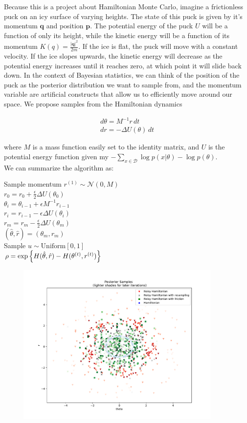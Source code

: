 Because this is a project about Hamiltonian Monte Carlo, imagine a frictionless puck on an icy surface of varying heights. The state of this puck is given by it's momentum $\bm{q}$ and position $\bm{p}$. The potential energy of the puck $U$ will be a function of only its height, while the kinetic energy will be a function of its momentum $K(q)=\frac{|\bm{q}|^2}{2m}$. If the ice is flat, the puck will move with a constant velocity. If the ice slopes upwards, the kinetic energy will decrease as the potential energy increases until it reaches zero, at which point it will slide back down. In the context of Bayesian statistics, we can think of the position of the puck as the posterior distribution we want to sample from, and the momentum variable are artificial constructs that allow us to efficiently move around our space. We propose samples from the Hamiltonian dynamics

\begin{gather*}
	d\theta=M^{-1}r\,dt\\
	dr = -\Delta U(\theta)\,dt
\end{gather*}

where $M$ is a mass function easily set to the identity matrix, and $U$ is the potential energy function given my $-\sum_{x\in\mathcal{D}}\log p(x|\theta)-\log p(\theta)$.
\\

We can summarize the algorithm as:

\begin{algorithm}[H]
	 {
		Sample momentum $r^{(1)}\sim\mathcal{N}(0, M)$\\
		$r_0=r_0+\frac{\epsilon}{2}\Delta U(\theta_0)$\\
		 {
			$\theta_i=\theta_{i-1}+\epsilon M^{-1}r_{i-1}$\\
			$r_i = r_{i-1} - \epsilon  \Delta U(\theta_i)$\\
		}
		$r_m = r_m -\frac{\epsilon}{2}\Delta U(\theta_m)$\\
		$(\hat{\theta}, \hat{r})=(\theta_m,r_m)$\\
		Sample $u\sim\mathrm{Uniform}[0, 1]$\\
		$\rho = \exp\left\lbrace H(\hat{\theta}, \hat{r})-H(\theta^{(t)}, r^{(t)}) \right\rbrace$\\
	}
\end{algorithm}




\begin{figure}[H]
\centering
\includegraphics[width=0.9\textwidth]{posterior_samples.pdf}
\end{figure}
